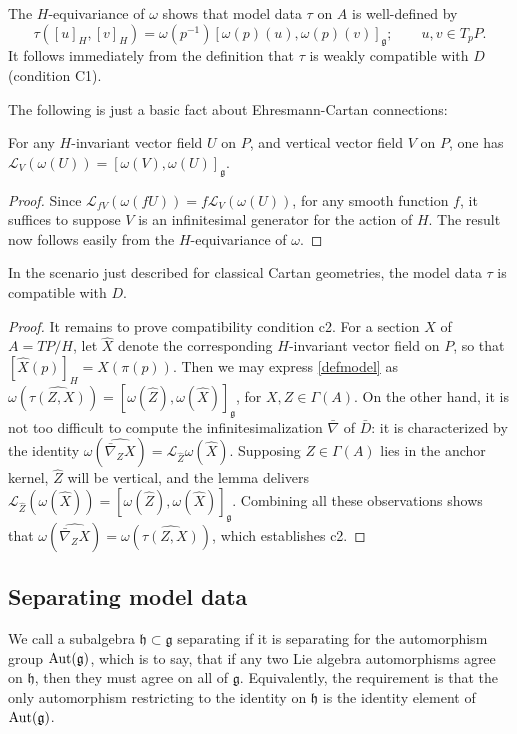\documentclass[leqno,12pt]{amsart} %
\begin{document}
The $H$-equivariance of $\omega $ shows that model data $\tau $ on $A$ is well-defined by
\begin{equation}
  \label{defmodel}
  \tau([u]_H, [v]_H) = \omega(p^{-1})[\omega(p)(u), \omega(p)(v)]_{\mathfrak g}; \qquad u, v \in T_p P.
\end{equation}
It follows immediately from the definition that $\tau $ is weakly compatible with $D$
(condition C1).

The following is just a basic fact about Ehresmann-Cartan connections:
\begin{lemma}
  For any $H$-invariant vector field $U$ on $P$, and vertical vector field $V $ on
  $P $, one has
  ${\mathcal L}_V(\omega(U)) = [\omega(V), \omega(U)]_{\mathfrak g}$.
\end{lemma}
\begin{proof}
  Since ${\mathcal L}_{fV}(\omega(fU)) = f {\mathcal L}_V(\omega(U))$, for any smooth
  function $f$, it suffices to suppose $V$ is an infinitesimal generator for the action of
  $H$. The result now follows easily from the $H$-equivariance of $\omega $.
\end{proof}
%
\begin{proposition}
  In the scenario just described for classical Cartan geometries, the model data $\tau $
  is compatible with $D$.
\end{proposition}
\begin{proof}
  It remains to prove compatibility condition c2. For a section $X$ of $A = T P /H$, let
  $\hat X$ denote the corresponding $H$-invariant vector field on $P$, so that
  $[\hat X(p)]_H=X(\pi(p))$. Then we may express \eqref{defmodel} as
  $\omega(\widehat{\tau(Z, X)}) = [\omega(\hat Z), \omega(\hat X)]_{\mathfrak g}$, for
  $X, Z \in \Gamma(A)$. On the other hand, it is not too difficult to compute the
  infinitesimalization $\bar\nabla $ of $\bar D$: it is characterized by the identity
  $\omega(\widehat{\bar\nabla_ZX}) = {\mathcal L}_{\hat Z}\omega(\hat X)$. Supposing
  $Z \in \Gamma(A)$ lies in the anchor kernel, $\hat Z$ will be
  vertical, and the lemma delivers
  ${\mathcal L}_{\hat Z}(\omega(\hat X))=[\omega(\hat Z), \omega(\hat X)]_{\mathfrak
    g}$. Combining all these observations shows that
  $\omega(\widehat{\bar\nabla_ZX}) = \omega(\widehat{\tau(Z, X)})$, which establishes c2.
\end{proof}

\subsection{Separating model data}\label{separating}
We call a subalgebra ${\mathfrak h} \subset {\mathfrak g} $ {\df separating} if it is
separating for the automorphism group $\operatorname{Aut}({\mathfrak g})$, which is to say,
that if any two Lie algebra automorphisms agree on ${\mathfrak h} $, then they must agree
on all of ${\mathfrak g}$. Equivalently, the requirement is that the only automorphism
restricting to the identity on ${\mathfrak h} $ is the identity element of
$\operatorname{Aut}({\mathfrak g})$.
\end{document}
